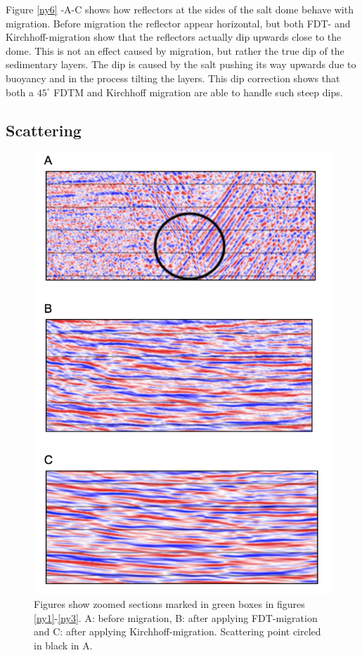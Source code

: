 \documentclass[10pt,a4paper]{article}
\begin{document}
Figure \ref{ny6} -A-C shows how reflectors at the sides of the salt dome behave with migration. Before migration the reflector appear horizontal, but both FDT- and Kirchhoff-migration show that the reflectors actually dip upwards close to the dome. This is not an effect caused by migration, but rather the true dip of the sedimentary layers. The dip is caused by the salt pushing its way upwards due to buoyancy and in the process tilting the layers. This dip correction shows that both a $45^{\circ}$ FDTM and Kirchhoff migration are able to handle such steep dips. 

\subsection{Scattering}

\begin{figure}[H]
\includegraphics[scale=0.4]{ny7.jpg}
\caption{Figures show zoomed sections marked in green boxes in figures \ref{ny1}-\ref{ny3}. 
A: before migration, B: after applying FDT-migration and C: after applying Kirchhoff-migration. Scattering point circled in black in A.}
\label{ny7}
\end{figure}
\end{document}
